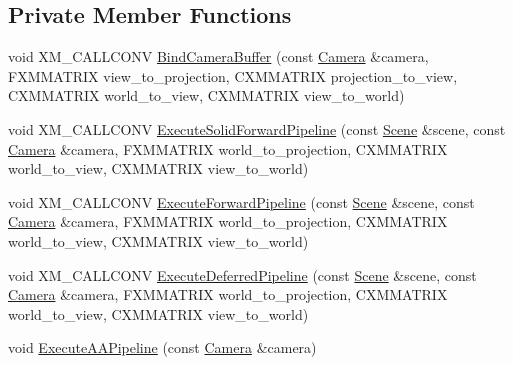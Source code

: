 \subsection*{Private Member Functions}
\begin{DoxyCompactItemize}
\item 
void X\+M\+\_\+\+C\+A\+L\+L\+C\+O\+NV \hyperlink{classmage_1_1_renderer_a9c49991b051183c89308b81ff02eda35}{Bind\+Camera\+Buffer} (const \hyperlink{classmage_1_1_camera}{Camera} \&camera, F\+X\+M\+M\+A\+T\+R\+IX view\+\_\+to\+\_\+projection, C\+X\+M\+M\+A\+T\+R\+IX projection\+\_\+to\+\_\+view, C\+X\+M\+M\+A\+T\+R\+IX world\+\_\+to\+\_\+view, C\+X\+M\+M\+A\+T\+R\+IX view\+\_\+to\+\_\+world)
\item 
void X\+M\+\_\+\+C\+A\+L\+L\+C\+O\+NV \hyperlink{classmage_1_1_renderer_af262c5909fc943477d9723828987c0d5}{Execute\+Solid\+Forward\+Pipeline} (const \hyperlink{classmage_1_1_scene}{Scene} \&scene, const \hyperlink{classmage_1_1_camera}{Camera} \&camera, F\+X\+M\+M\+A\+T\+R\+IX world\+\_\+to\+\_\+projection, C\+X\+M\+M\+A\+T\+R\+IX world\+\_\+to\+\_\+view, C\+X\+M\+M\+A\+T\+R\+IX view\+\_\+to\+\_\+world)
\item 
void X\+M\+\_\+\+C\+A\+L\+L\+C\+O\+NV \hyperlink{classmage_1_1_renderer_afd977cdfa89847cc0529e0b793af9988}{Execute\+Forward\+Pipeline} (const \hyperlink{classmage_1_1_scene}{Scene} \&scene, const \hyperlink{classmage_1_1_camera}{Camera} \&camera, F\+X\+M\+M\+A\+T\+R\+IX world\+\_\+to\+\_\+projection, C\+X\+M\+M\+A\+T\+R\+IX world\+\_\+to\+\_\+view, C\+X\+M\+M\+A\+T\+R\+IX view\+\_\+to\+\_\+world)
\item 
void X\+M\+\_\+\+C\+A\+L\+L\+C\+O\+NV \hyperlink{classmage_1_1_renderer_a3fb91b8f8f0022e9e8381103c7e23427}{Execute\+Deferred\+Pipeline} (const \hyperlink{classmage_1_1_scene}{Scene} \&scene, const \hyperlink{classmage_1_1_camera}{Camera} \&camera, F\+X\+M\+M\+A\+T\+R\+IX world\+\_\+to\+\_\+projection, C\+X\+M\+M\+A\+T\+R\+IX world\+\_\+to\+\_\+view, C\+X\+M\+M\+A\+T\+R\+IX view\+\_\+to\+\_\+world)
\item 
void \hyperlink{classmage_1_1_renderer_a9ffd7b8c58e4647b38d864778d53d390}{Execute\+A\+A\+Pipeline} (const \hyperlink{classmage_1_1_camera}{Camera} \&camera)
\end{DoxyCompactItemize}
